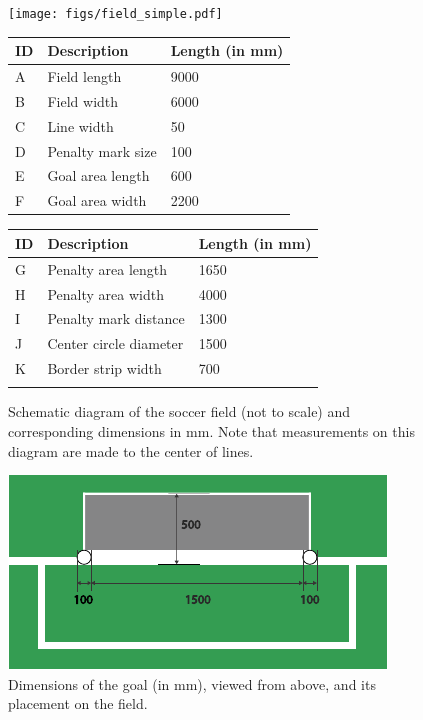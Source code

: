 \begin{figure}[b!]
\centering
\centerline{\texttt{[image: figs/field\_simple.pdf]}}
\vspace{1ex}
\begin{tabular}{| l | l | l |}
ID & Description & Length (in mm) \\
\hline \hline
A & Field length & 9000 \\
\hline
B & Field width & 6000 \\
\hline
C & Line width & 50 \\
\hline
D & Penalty mark size & 100 \\
\hline
E & Goal area length & 600 \\
\hline
F & Goal area width & 2200 \\
\end{tabular}
\begin{tabular}{|l|l|l|}
ID & Description & Length (in mm) \\
\hline \hline
G & Penalty area length & 1650 \\
\hline
H & Penalty area width & 4000 \\
\hline
I & Penalty mark distance & 1300 \\
\hline
J & Center circle diameter & 1500 \\
\hline
K & Border strip width & 700 \\
\hline
 &  &  \\
\end{tabular}
\caption{Schematic diagram of the soccer field (not to scale) and corresponding dimensions in mm.  Note that measurements on this diagram are made to the center of lines.}
\label{fig:field_dim}
\end{figure}


\begin{figure}[t!]
\begin{center}
\leavevmode
\includegraphics[width=1\columnwidth]{figs/goalDimensions2015.pdf}
\caption{Dimensions of the goal (in mm), viewed from above, and its placement on the field.}
\label{fig:goal_dimensions}
\end{center}
\end{figure}

